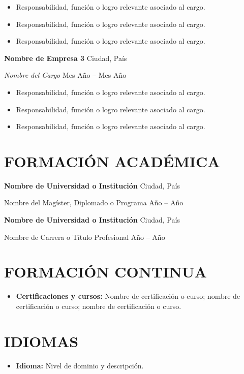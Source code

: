 \documentclass[10pt,a4paper]{article}
\newcommand{\entidad}[2]{%
    \noindent
    \textbf{#1}\hfill
    {\small\color{secundario}#2}\par
}
\newcommand{\cargo}[2]{%
    \noindent
    \textit{#1}\hfill
    {\small\color{secundario}#2}\par
}
\newcommand{\programa}[2]{%
    \noindent
    #1\hfill
    {\small\color{secundario}#2}\par
}
\begin{document}
\begin{itemize}
    \item Responsabilidad, función o logro relevante asociado al cargo.
    \item Responsabilidad, función o logro relevante asociado al cargo.
    \item Responsabilidad, función o logro relevante asociado al cargo.
\end{itemize}

\vspace{3pt}

\entidad{Nombre de Empresa 3}{Ciudad, País}
\cargo{Nombre del Cargo}{Mes Año -- Mes Año}

\begin{itemize}
    \item Responsabilidad, función o logro relevante asociado al cargo.
    \item Responsabilidad, función o logro relevante asociado al cargo.
    \item Responsabilidad, función o logro relevante asociado al cargo.
\end{itemize}

\section{FORMACIÓN ACADÉMICA}

\entidad{Nombre de Universidad o Institución}{Ciudad, País}
\programa{Nombre del Magíster, Diplomado o Programa}{Año -- Año}

\vspace{5pt}

\entidad{Nombre de Universidad o Institución}{Ciudad, País}
\programa{Nombre de Carrera o Título Profesional}{Año -- Año}

\section{FORMACIÓN CONTINUA}

\begin{itemize}
    \item \textbf{Certificaciones y cursos:}
    Nombre de certificación o curso;
    nombre de certificación o curso;
    nombre de certificación o curso.
\end{itemize}

\section{IDIOMAS}

\begin{itemize}
    \item \textbf{Idioma:} Nivel de dominio y descripción.
\end{itemize}
\end{document}
